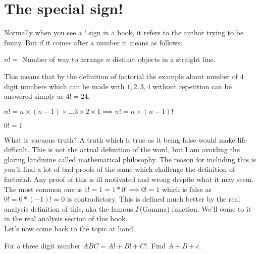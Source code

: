 \section{The special sign!}
Normally when you see a ! sign in a book, it refers to the author trying to be funny. But if it comes after a number it means as follows:\\
\begin{definition}
    [Factorial]
    $n!=$ Number of way to arrange $n$ distinct objects in a straight line.
\end{definition}
This means that by the definition of factorial the example about number of $4$ digit numbers which can be made with $1,2,3,4$ without repetition can be answered simply as $4!=24$.\\
\begin{theorem}
    $n!=n\times (n-1)\times \dots 3\times 2 \times 1 \implies n!=n \times (n-1)!$
\end{theorem}
\begin{theorem}
    $0!=1$
\end{theorem}
What is vacuous truth? A truth which is true as it being false would make life difficult. This is not the actual definition of the word, but I am avoiding the glaring landmine called mathematical philosophy. The reason for including this is you'll find a lot of bad proofs of the same which challenge the definition of factorial. Any proof of this is ill motivated and wrong despite what it may seem.\\
The most common one is $1!=1=1*0! \implies 0!=1$ which is false as $0!=0*(-1)!=0$ is contradictory. This is defined much better by the real analysis definition of this, aka the famous $\Gamma$(Gamma) function. We'll come to it in the real analysis section of this book.\\
Let's now come back to the topic at hand.
\begin{example}
For a three digit number $\overline{ABC} = A!+B!+C!$. Find $A+B+c$.
\end{example}
